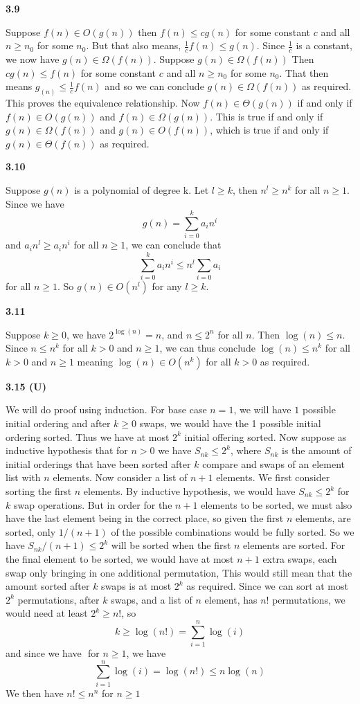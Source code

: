 \textbf{3.9}

Suppose $f(n)\in O(g(n))$ then $ f(n)\leq cg(n)$ for some constant $c$ and all $n\geq n_0$ for some $n_0$. But that also means, $\frac{1}{c}f(n)\leq g(n)$. Since $\frac{1}{c}$ is a constant, we now have $ g(n)\in \Omega(f(n))$. Suppose $g(n)\in \Omega(f(n))$ Then $ cg(n) \leq f(n)$ for some constant $c$ and all $n\geq n_0$ for some $n_0$. That then means $g_(n)\leq \frac{1}{c}f(n)$ and so we can conclude $ g(n)\in \Omega(f(n))$ as required. This proves the equivalence relationship. Now $f(n)\in \Theta(g(n))$ if and only if $ f(n)\in O(g(n))$ and $ f(n)\in \Omega(g(n))$. This is true if and only if $ g(n)\in \Omega(f(n))$ and $g(n) \in O(f(n))$, which is true if and only if $ g(n)\in \Theta(f(n))$ as required.

\textbf{3.10}

Suppose $g(n)$ is a polynomial of degree k. Let $l\geq k$, then $n^l\geq n^k$ for all $n\geq 1$. Since we have \[g(n) 
= \sum_{i=0}^ka_in^i\] and $ a_in^l\geq a_in^i$ for all $n\geq 1$, we can conclude that \[\sum_{i=0}^ka_in^i \leq n^l\sum_{i=0}a_i\] for all $n\geq 1$. So $g(n)\in O(n^l)$ for any $l\geq k$. 


\textbf{3.11}

Suppose $k\geq 0$, we have $ 2^{\log(n)} = n$, and $ n\leq 2^n$ for all $n$. Then $\log(n) \leq n$. Since $n\leq n^k$ for all $k>0$ and $n\geq 1$, we can thus conclude $\log(n) \leq n^k$ for all $k>0$ and $n\geq 1$ meaning $ \log(n) \in O(n^k)$ for all $k>0$ as required.

\textbf{3.15 (U)}

We will do proof using induction. For base case $n=1$, we will have $ 1$ possible initial ordering and after $k\geq 0$ swaps, we would have the 1 possible initial ordering sorted. Thus we have at most $2^k$ initial offering sorted. Now suppose as inductive hypothesis that for $n>0$ we have $ S_{nk}\leq 2^k$, where $S_{nk}$ is the amount of initial orderings that have been sorted after $k$ compare and swaps of an element list with $n$ elements. Now consider a list of $n+1$ elements. We first consider sorting the first $n$ elements. By inductive hypothesis, we would have $ S_{nk}\leq 2^k$ for $k$ swap operations. But in order for the $n+1$ elements to be sorted, we must also have the last element being in the correct place, so given the first $n$ elements, are sorted, only $1/(n+1)$ of the possible combinations would be fully sorted. So we have $ S_{nk}/(n+1) \leq 2^k$ will be sorted when the first $n$ elements are sorted. For the final element to be sorted, we would have at most $n+1$ extra swaps, each swap only bringing in one additional permutation, This would still mean that the amount sorted after $k$ swaps is at most $2^k$ as required.
Since we can sort at most $2^k$ permutations, after $k$ swaps, and a list of $n$ element, has $n!$ permutations, we would need at least $2^k \geq n!$, so \[k \geq \log(n!) = \sum_{i=1}^n\log(i)\] and since we have $ $ for $n\geq 1$, we have 
\[\sum_{i=1}^n\log(i) = \log(n!) \leq n\log(n)\] We then have $ n! \leq n^n$ for $n\geq 1$

